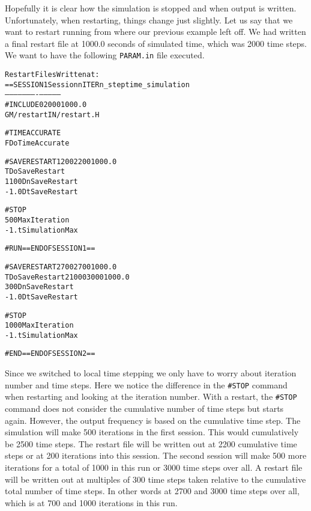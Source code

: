 Hopefully it is clear how the simulation is stopped and when output is written.
Unfortunately, when restarting, things change just slightly. 
Let us say that we want to restart running from where our previous example left off.
We had written a final restart file at 1000.0 seconds of simulated time, which
was 2000 time steps.  We want to have the following {\tt PARAM.in} file
executed. 
\begin{alltt}
                                             Restart Files Written at:
==SESSION 1      \hfill        Session   nITER   n_step   time_simulation
                 \hfill        --------  ------  -------  --------------
#INCLUDE                         \hfill            0     2000           1000.0
GM/restartIN/restart.H

#TIMEACCURATE
F            DoTimeAccurate  

#SAVERESTART                      \hfill  1       200     2200           1000.0
T            DoSaveRestart
1100         DnSaveRestart
-1.0         DtSaveRestart

#STOP
500          MaxIteration
-1.          tSimulationMax

#RUN ==END OF SESSION 1== 

#SAVERESTART                      \hfill  2       700     2700           1000.0
T            DoSaveRestart	  \hfill  2      1000     3000           1000.0
300          DnSaveRestart
-1.0         DtSaveRestart

#STOP
1000         MaxIteration
-1.          tSimulationMax

#END ==END OF SESSION 2== 
                          
\end{alltt}
Since we switched to local time stepping we only have to worry about iteration
number and time steps.  Here we notice the difference in the {\tt \#STOP} command when
restarting and looking at the iteration number.  With a restart, 
the {\tt \#STOP} command does not consider the cumulative number of time steps but starts
again.  However, the output frequency is based on the cumulative time step.  
The simulation will make 500 iterations
in the first session.  This would cumulatively be 2500 time steps.  The restart
file will be written out at 2200 cumulative time steps or at 200 iterations into this
session.  The second session will make 500 more iterations for a total of 1000
in this run or 3000 time steps over all.  A restart file will be written out at multiples
of 300 time steps taken relative to the cumulative total number of time steps.  In other
words at 2700 and 3000 time steps over all, which is at 700 and 1000 iterations in
this run.

